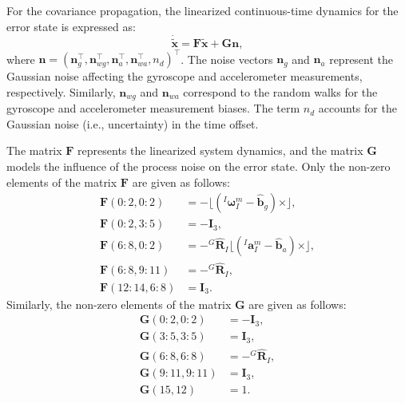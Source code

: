 For the covariance propagation, the linearized continuous-time dynamics for the error state is expressed as:
\begin{equation}
\label{ekf}
    \dot{\tilde{\mathbf{x}}} = \mathbf{F}\tilde{\mathbf{x}} + \mathbf{G}\mathbf{n},
\end{equation}
where $\mathbf{n} = \left( \mathbf{n}_g^\top, \mathbf{n}_{wg}^\top, \mathbf{n}_a^\top, \mathbf{n}_{wa}^\top, n_d \right)^\top$. The noise vectors $\mathbf{n}_g$ and $\mathbf{n}_a$ represent the Gaussian noise affecting the gyroscope and accelerometer measurements, respectively. Similarly, $\mathbf{n}_{wg}$ and $\mathbf{n}_{wa}$ correspond to the random walks for the gyroscope and accelerometer measurement biases. The term $n_d$ accounts for the Gaussian noise (i.e., uncertainty) in the time offset.

The matrix $\mathbf{F}$ represents the linearized system dynamics, and the matrix $\mathbf{G}$ models the influence of the process noise on the error state. Only the non-zero elements of the matrix $\mathbf{F}$ are given as follows:
\begin{equation}
    \begin{aligned}
        \mathbf{F}(0:2, 0:2) &= -\lfloor ({}^I{\boldsymbol{\omega}}_I^m - \hat{\mathbf{b}}_g) \times \rfloor, \\
        \mathbf{F}(0:2, 3:5) &= -\mathbf{I}_{3}, \\
        \mathbf{F}(6:8, 0:2) &= -{}^G\hat{\mathbf{R}}_I \lfloor ({}^I{\mathbf{a}}_I^m - \hat{\mathbf{b}}_a) \times \rfloor, \\
        \mathbf{F}(6:8, 9:11) &= -{}^G\hat{\mathbf{R}}_I, \\
        \mathbf{F}(12:14, 6:8) &= \mathbf{I}_{3}.
    \end{aligned}
\end{equation}
Similarly, the non-zero elements of the matrix $\mathbf{G}$ are given as follows:
\begin{equation}
    \begin{aligned}
        \mathbf{G}(0:2, 0:2) &= -\mathbf{I}_{3}, \\
        \mathbf{G}(3:5, 3:5) &= \mathbf{I}_{3}, \\
        \mathbf{G}(6:8, 6:8) &= -{}^G\hat{\mathbf{R}}_I, \\
        \mathbf{G}(9:11, 9:11) &= \mathbf{I}_{3}, \\
        \mathbf{G}(15, 12) &= 1.
    \end{aligned}
\end{equation}

